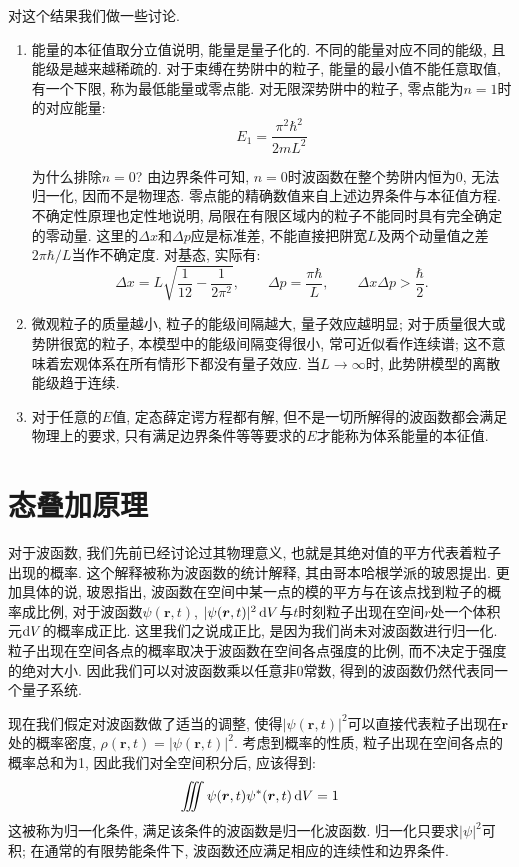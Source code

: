 对这个结果我们做一些讨论.
\begin{enumerate}
  \item 能量的本征值取分立值说明, 能量是量子化的. 不同的能量对应不同的能级, 且能级是越来越稀疏的. 对于束缚在势阱中的粒子, 能量的最小值不能任意取值, 有一个下限, 称为最低能量或零点能. 对无限深势阱中的粒子, 零点能为$n=1$时的对应能量:
  \[
  E_1 = \frac{\pi^2\hbar^2}{2mL^2}
  \]

  为什么排除$n=0$? 由边界条件可知, $n=0$时波函数在整个势阱内恒为$0$, 无法归一化, 因而不是物理态. 零点能的精确数值来自上述边界条件与本征值方程. 不确定性原理也定性地说明, 局限在有限区域内的粒子不能同时具有完全确定的零动量. 这里的$\Delta x$和$\Delta p$应是标准差, 不能直接把阱宽$L$及两个动量值之差$2\pi\hbar/L$当作不确定度. 对基态, 实际有:
  \[
  \Delta x=L\sqrt{\frac{1}{12}-\frac{1}{2\pi^2}},\qquad \Delta p=\frac{\pi\hbar}{L},\qquad \Delta x\Delta p>\frac{\hbar}{2}.
  \]

  \item 微观粒子的质量越小, 粒子的能级间隔越大, 量子效应越明显; 对于质量很大或势阱很宽的粒子, 本模型中的能级间隔变得很小, 常可近似看作连续谱; 这不意味着宏观体系在所有情形下都没有量子效应. 当$L\to\infty$时, 此势阱模型的离散能级趋于连续.
  \item 对于任意的$E$值, 定态薛定谔方程都有解, 但不是一切所解得的波函数都会满足物理上的要求, 只有满足边界条件等等要求的$E$才能称为体系能量的本征值.
\end{enumerate}
\section{态叠加原理}
对于波函数, 我们先前已经讨论过其物理意义, 也就是其绝对值的平方代表着粒子出现的概率. 这个解释被称为波函数的统计解释, 其由哥本哈根学派的玻恩提出. 更加具体的说, 玻恩指出, 波函数在空间中某一点的模的平方与在该点找到粒子的概率成比例, 对于波函数$\psi(\bm{r}, t)$, $|\psi(\bm{r}, t)|^2 \mathop{}\!\mathrm{d} V$与$t$时刻粒子出现在空间$r$处一个体积元$\mathop{}\!\mathrm{d} V$的概率成正比. 这里我们之说成正比, 是因为我们尚未对波函数进行归一化. 粒子出现在空间各点的概率取决于波函数在空间各点强度的比例, 而不决定于强度的绝对大小. 因此我们可以对波函数乘以任意非0常数, 得到的波函数仍然代表同一个量子系统.

现在我们假定对波函数做了适当的调整, 使得$|\psi(\bm{r}, t)|^2$可以直接代表粒子出现在$\bm{r}$处的概率密度, $\rho(\bm{r}, t)=|\psi(\bm{r}, t)|^2$. 考虑到概率的性质, 粒子出现在空间各点的概率总和为1, 因此我们对全空间积分后, 应该得到:
\[
\iiint\psi(\bm{r}, t)\psi^*(\bm{r}, t)\mathop{}\!\mathrm{d} V = 1
\]
这被称为归一化条件, 满足该条件的波函数是归一化波函数. 归一化只要求$|\psi|^2$可积; 在通常的有限势能条件下, 波函数还应满足相应的连续性和边界条件.

